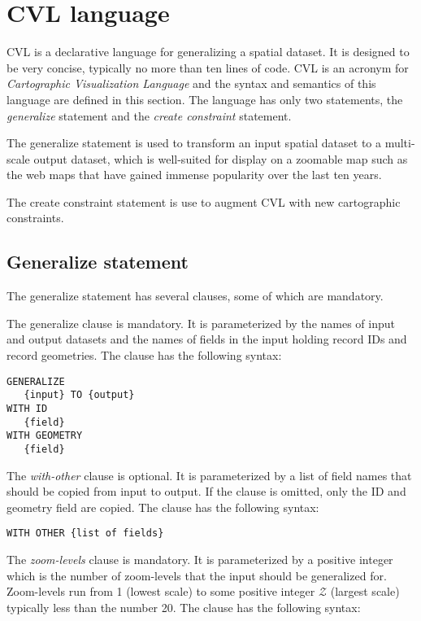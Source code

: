 \section{CVL language}
\label{sec:cvl-language}
CVL is a declarative language for generalizing a spatial dataset. It is designed to be very concise, typically no more than ten lines of code. CVL is an acronym for \emph{Cartographic Visualization Language} and the syntax and semantics of this language are defined in this section. The language has only two statements, the \emph{generalize} statement and the \emph{create constraint} statement. 

The generalize statement is used to transform an input spatial dataset to a multi-scale output dataset, which is well-suited for display on a zoomable map such as the web maps that have gained immense popularity over the last ten years. 

The create constraint statement is use to augment CVL with new cartographic constraints.

\subsection{Generalize statement}
The generalize statement has several clauses, some of which are mandatory. 

The generalize clause is mandatory. It is parameterized by the names of input and output datasets and the names of fields in the input holding record IDs and record geometries. The clause has the following syntax:

\begin{lstlisting}
GENERALIZE 
   {input} TO {output}
WITH ID
   {field}
WITH GEOMETRY 
   {field}
\end{lstlisting}

The \emph{with-other} clause is optional. It is parameterized by a list of field names that should be copied from input to output. If the clause is omitted, only the ID and geometry field are copied. The clause has the following syntax:

\begin{lstlisting}
WITH OTHER {list of fields}
\end{lstlisting}

The \emph{zoom-levels} clause is mandatory. It is parameterized by a positive integer which is the number of zoom-levels that the input should be generalized for. Zoom-levels run from 1 (lowest scale) to some positive integer $\mathcal{Z}$ (largest scale) typically less than the number 20. The clause has the following syntax:

